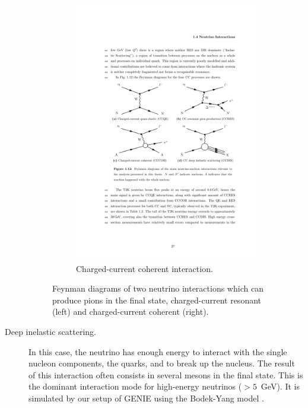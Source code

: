 \begin{description}
\begin{figure}[htbp]
\begin{subfigure}{0.48\textwidth}
\begin{center}
    \includegraphics[width=\linewidth]{figures/ccoh_feyn.pdf}
    \caption{Charged-current coherent interaction.}
    \label{fig:ccoh_feyn}
    \end{center}
  \end{subfigure}
  \caption{Feynman diagrams of two neutrino interactions which can produce pions in the final state, charged-current resonant (left) and charged-current coherent (right).}
\end{figure}

\item[Deep inelastic scattering.] In this case, the neutrino has enough energy to interact with the single nucleon components, the quarks, and to break up the nucleus. The result of this interaction often consists in several mesons in the final state. This is the dominant interaction mode for high-energy neutrinos ($>5$~GeV). It is simulated by our setup of GENIE using the Bodek-Yang model \cite{Yang:1998zb}.


\end{description}
